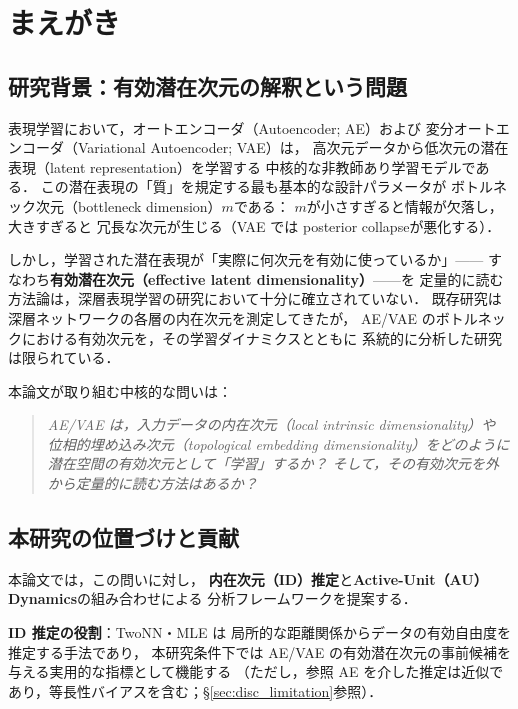 \documentclass[11pt,a4paper]{jsarticle}
\begin{document}
\section{まえがき}\label{sec:intro}

\subsection{研究背景：有効潜在次元の解釈という問題}\label{sec:intro_bg}

表現学習において，オートエンコーダ（Autoencoder; AE）および
変分オートエンコーダ（Variational Autoencoder; VAE）\cite{kingma2014vae}は，
高次元データから低次元の潜在表現（latent representation）を学習する
中核的な非教師あり学習モデルである\cite{bengio2013representation}．
この潜在表現の「質」を規定する最も基本的な設計パラメータが
ボトルネック次元（bottleneck dimension）$m$である：
$m$が小さすぎると情報が欠落し，大きすぎると
冗長な次元が生じる（VAE では posterior collapse\cite{lucas2019elbo}が悪化する）．

しかし，学習された潜在表現が「実際に何次元を有効に使っているか」——
すなわち\textbf{有効潜在次元（effective latent dimensionality）}——を
定量的に読む方法論は，深層表現学習の研究において十分に確立されていない．
既存研究\cite{ansuini2019intrinsic,valeriani2023geometry}は
深層ネットワークの各層の内在次元を測定してきたが，
AE/VAE のボトルネックにおける有効次元を，その学習ダイナミクスとともに
系統的に分析した研究は限られている．

本論文が取り組む中核的な問いは：
\begin{quote}
\textit{AE/VAE は，入力データの内在次元（local intrinsic dimensionality）や
位相的埋め込み次元（topological embedding dimensionality）をどのように
潜在空間の有効次元として「学習」するか？
そして，その有効次元を外から定量的に読む方法はあるか？}
\end{quote}

\subsection{本研究の位置づけと貢献}\label{sec:intro_aim}

本論文では，この問いに対し，
\textbf{内在次元（ID）推定}と\textbf{Active-Unit（AU）Dynamics}の組み合わせによる
分析フレームワークを提案する．

\textbf{ID 推定の役割}：TwoNN\cite{facco2017twonn}・MLE\cite{levina2005mle} は
局所的な距離関係からデータの有効自由度を推定する手法であり，
本研究条件下では AE/VAE の有効潜在次元の事前候補を与える実用的な指標として機能する
（ただし，参照 AE を介した推定は近似であり，等長性バイアスを含む；§\ref{sec:disc_limitation}参照）．
\end{document}
